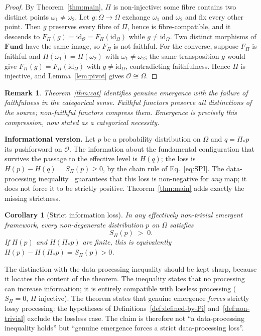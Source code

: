 \documentclass[12pt,a4paper]{article}
\newtheorem{corollary}[theorem]{Corollary}
\newtheorem{remark}{Remark}
\begin{document}
  \begin{proof}
    By Theorem~\ref{thm:main}, $\Pi$ is non-injective: some fibre contains two distinct points
    $\omega_1 \neq \omega_2$.
    Let $g : \Omega \to \Omega$ exchange $\omega_1$ and $\omega_2$ and fix every other point.
    Then $g$ preserves every fibre of $\Pi$, hence is fibre-compatible, and it descends to
    $F_\Pi(g) = \mathrm{id}_{\mathcal{O}} = F_\Pi(\mathrm{id}_\Omega)$ while $g \neq \mathrm{id}_\Omega$.
    Two distinct morphisms of $\mathbf{Fund}$ have the same image, so $F_\Pi$ is not faithful.
    For the converse, suppose $F_\Pi$ is faithful and $\Pi(\omega_1) = \Pi(\omega_2)$ with
    $\omega_1 \neq \omega_2$; the same transposition $g$ would give $F_\Pi(g) = F_\Pi(\mathrm{id}_\Omega)$ with
    $g \neq \mathrm{id}_\Omega$, contradicting faithfulness.
    Hence $\Pi$ is injective, and Lemma~\ref{lem:pivot} gives $\mathcal{O} \cong \Omega$.
  \end{proof}

  \begin{remark}
    Theorem~\ref{thm:cat} identifies genuine emergence with the failure of
    faithfulness in the categorical sense.
    Faithful functors preserve all distinctions of the source; non-faithful
    functors compress them.
    Emergence is precisely this compression, now stated as a categorical necessity.
  \end{remark}

  \textbf{Informational version.}
  Let $p$ be a probability distribution on $\Omega$ and $q = \Pi_* p$ its pushforward on $\mathcal{O}$.
  The information about the fundamental configuration that survives the passage to the effective level is
  $H(q)$; the loss is $H(p) - H(q) = S_\Pi(p) \geq 0$, by the chain rule of Eq.~\eqref{eq:SPI}.
  The data-processing inequality~\citep{CoverThomas2006} guarantees that this loss is non-negative for
  \emph{any} map; it does not force it to be strictly positive.
  Theorem~\ref{thm:main} adds exactly the missing strictness.

  \begin{corollary}[Strict information loss]
    \label{cor:info}
    In any effectively non-trivial emergent framework, every non-degenerate distribution $p$ on $\Omega$
    satisfies
    \[
      S_\Pi(p) \;>\; 0 .
    \]
    If $H(p)$ and $H(\Pi_* p)$ are finite, this is equivalently $H(p) - H(\Pi_* p) = S_\Pi(p) > 0$.
  \end{corollary}

  The distinction with the data-processing inequality should be kept sharp, because it locates the content of
  the theorem.
  The inequality states that no processing can increase information; it is entirely compatible with lossless
  processing ($S_\Pi = 0$, $\Pi$ injective).
  The theorem states that genuine emergence \emph{forces} strictly lossy processing: the hypotheses of
  Definitions~\ref{def:defined-by-Pi} and~\ref{def:non-trivial} exclude the lossless case.
  The claim is therefore not ``a data-processing inequality holds'' but ``genuine emergence forces a strict
  data-processing loss''.
\end{document}
